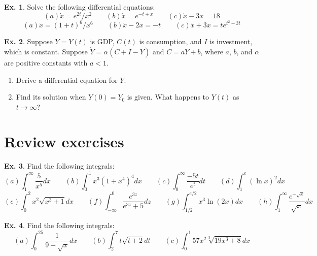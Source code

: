 \documentclass[10pt,a4paper]{book}
\theoremstyle{definition}\newtheorem{definition}{Definition}
\theoremstyle{definition}\newtheorem{fact}{Fact}
\theoremstyle{definition}\newtheorem{ex}{Ex.}
\theoremstyle{definition}\newtheorem{project}{Project}
\theoremstyle{definition}\newtheorem{problem}{Problem}
\theoremstyle{definition}\newtheorem{example}{Example}
\numberwithin{theorem}{chapter}
\numberwithin{corollary}{chapter}
\numberwithin{assumption}{chapter}
\numberwithin{definition}{chapter}
\numberwithin{prop}{chapter}
\numberwithin{notation}{chapter}
\numberwithin{problem}{chapter}
\numberwithin{example}{chapter}
\numberwithin{fact}{chapter}
\numberwithin{ex}{chapter}
\begin{document}
	\begin{ex}
		Solve the following differential equations:
		\begin{equation*}
			(a) \dot{x} = e^{2t}/x^2 \qquad
			(b) \dot{x} = e^{-t+x} \qquad
			(c) \dot{x}-3x =18
		\end{equation*}
		\begin{equation*}
			(a) \dot{x} = (1+t)^6/x^6 \qquad
			(b) \dot{x}-2x = -t \qquad
			(c) \dot{x}+3x = te^{t^2-3t}
		\end{equation*}
	\end{ex}
	
	\begin{ex}
		Suppose $Y = Y(t)$ is GDP, $C(t)$ is consumption, and $I$ is investment, which is constant. Suppose $\dot{Y} = \alpha (C + \bar{I} - Y)$ and $C = aY + b$, where $a$, $b$, and $\alpha$ are positive constants with $a < 1$.
		\begin{enumerate}[label=(\alph*)]
			\item Derive a differential equation for $Y$.
			\item Find its solution when $Y(0) = Y_0$ is given. What happens to $Y(t)$ as $t \rightarrow \infty$?
		\end{enumerate}
	\end{ex}
	
	\section{Review exercises}
	
	\begin{ex}
		Find the following integrals:
		\begin{equation*}
			(a) \int_1^{\infty} \frac{5}{x^5}dx \qquad
			(b) \int_0^1 x^3(1+x^4)^4dx \qquad
			(c) \int_0^{\infty} \frac{-5t}{e^t}dt \qquad
			(d) \int_1^e (\ln x)^2 dx
		\end{equation*}
		\begin{equation*}
			(e) \int_0^2 x^2\sqrt{x^3+1}dx \qquad
			(f) \int_{-\infty}^0 \frac{e^{3z}}{e^{3z}+5}dz \qquad
			(g) \int_{1/2}^{e/2} x^3 \ln (2x) dx \qquad
			(h) \int_1^{\infty} \frac{e^{-\sqrt{x}}}{\sqrt{x}} dx
		\end{equation*}
	\end{ex}
	
	\begin{ex}
		Find the following integrals:
		\begin{equation*}
			(a) \int_0^{25} \frac{1}{9+\sqrt{x}}dx \qquad
			(b) \int_2^7 t\sqrt{t+2} dt \qquad
			(c) \int_0^1 57x^2\sqrt[3]{19x^3+8}dx
		\end{equation*}
	\end{ex}
	
\end{document}
